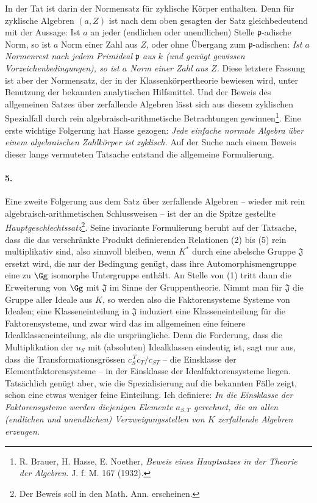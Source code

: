 In der Tat ist darin der Normensatz für zyklische Körper enthalten. Denn für zyklische Algebren \((a,Z)\) ist nach dem oben gesagten der Satz gleichbedeutend mit der Aussage: Ist \(a\) an jeder (endlichen oder unendlichen) Stelle \(\mathfrak p\)-adische Norm, so ist \(a\) Norm einer Zahl aus \(Z\), oder ohne Übergang zum \(\mathfrak p\)-adischen: \emph{Ist \(a\) Normenrest nach jedem Primideal \(\mathfrak p\) aus \(k\) (und genügt gewissen Vorzeichenbedingungen), so ist \(a\) Norm einer Zahl aus \(Z\).} Diese letztere Fassung ist aber der Normensatz, der in der Klassenkörpertheorie bewiesen wird, unter Benutzung der bekannten analytischen Hilfsmittel. Und der Beweis des allgemeinen Satzes über zerfallende Algebren lässt sich aus diesem zyklischen Spezialfall durch rein algebraisch-arithmetische Betrachtungen gewinnen\footnote{R. Brauer, H. Hasse, E. Noether, \emph{Beweis eines Hauptsatzes in der Theorie der Algebren}. J. f. M. 167 (1932).}. Eine erste wichtige Folgerung hat Hasse gezogen: \emph{Jede einfache normale Algebra über einem algebraischen Zahlkörper ist zyklisch.} Auf der Suche nach einem Beweis dieser lange vermuteten Tatsache entstand die allgemeine Formulierung.

\paragraph{5.}
Eine zweite Folgerung aus dem Satz über zerfallende Algebren -- wieder mit rein algebraisch-arithmetischen Schlussweisen -- ist der an die Spitze gestellte \emph{Hauptgeschlechtssatz}\footnote{Der Beweis soll in den Math. Ann. erscheinen.}. Seine invariante Formulierung beruht auf der Tatsache, dass die das verschränkte Produkt definierenden Relationen (2) bis (5) rein multiplikativ sind, also sinnvoll bleiben, wenn \(K^\ast\) durch eine abelsche Gruppe \(\mathfrak J\) ersetzt wird, die nur der Bedingung genügt, dass ihre Automorphismengruppe eine zu \(\Gg\) isomorphe Untergruppe enthält. An Stelle von (1) tritt dann die \glqq{}Erweiterung von \(\Gg\) mit \(\mathfrak J\)\grqq{} im Sinne der Gruppentheorie. Nimmt man für \(\mathfrak J\) die Gruppe aller Ideale aus \(K\), so werden also die Faktorensysteme Systeme von Idealen; eine Klasseneinteilung in \(\mathfrak J\) induziert eine Klasseneinteilung für die Faktorensysteme, und zwar wird das im allgemeinen eine feinere Idealklasseneinteilung, als die ursprüngliche. Denn die Forderung, dass die Multiplikation der \(u_S\) mit (absoluten) Idealklassen eindeutig ist, sagt nur aus, dass die Transformationsgrössen \(c_S^{\,T}c_T/c_{ST}\) -- die Einsklasse der Elementfaktorensysteme -- in der Einsklasse der Idealfaktorensysteme liegen. Tatsächlich genügt aber, wie die Spezialisierung auf die bekannten Fälle zeigt, schon eine etwas weniger feine Einteilung. Ich definiere: \emph{In die Einsklasse der Faktorensysteme werden diejenigen Elemente \(a_{S,T}\) gerechnet, die an allen (endlichen und unendlichen) Verzweigungsstellen von \(K\) zerfallende Algebren erzeugen.}


